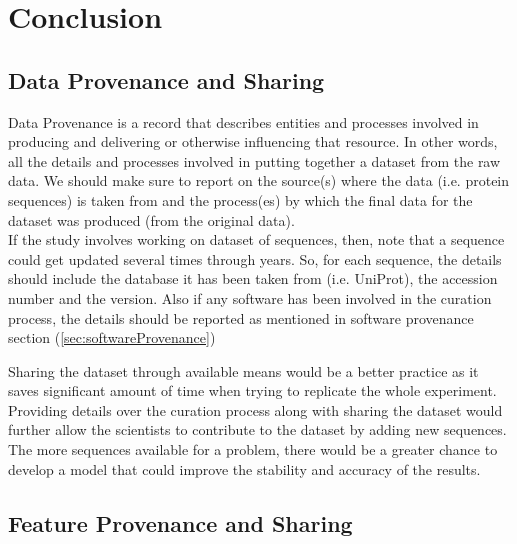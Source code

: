 \section {Conclusion}

\subsection{Data Provenance and Sharing}


    Data Provenance is a record that describes entities and processes involved in producing and delivering or otherwise influencing 
    that resource.\cite{w3c}  In other words, all the details and processes involved in putting together a dataset from the raw data. 
    We should make sure to report on the source(s) where the data (i.e. protein sequences) is taken from and the process(es) 
    by which the final data for the dataset was produced (from the original data). \\
    
    If the study involves working on dataset of sequences, then, note that a sequence could get updated several times through years. 
    So, for each sequence, the details should include the database it has been taken from (i.e. UniProt), 
    the accession number and the version. Also if any software has been involved in the curation \footnotemark process, 
    the details should be reported as mentioned in software provenance section (\ref{sec:softwareProvenance})\\
    
    
    Sharing the dataset through available means would be a better practice as it saves significant amount of time when
    trying to replicate the whole experiment.
    Providing details over the curation process along with sharing the dataset would further allow the scientists to contribute to the 
    dataset by adding new sequences. The more sequences available for a problem, there would be a greater chance to develop a model 
    that could improve the stability and accuracy of the results.
    
\subsection{Feature Provenance and Sharing}

